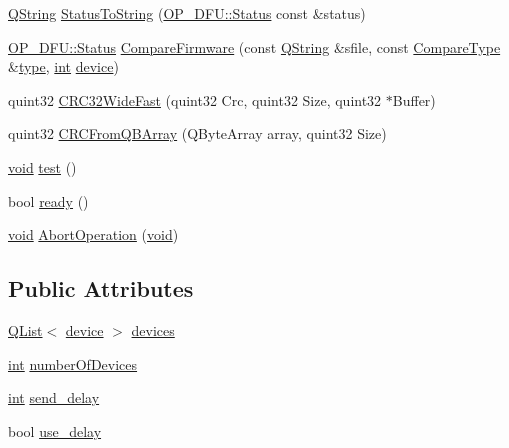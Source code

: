 \begin{DoxyCompactItemize}
\item 
\hyperlink{group___u_a_v_objects_plugin_gab9d252f49c333c94a72f97ce3105a32d}{Q\-String} \hyperlink{class_o_p___d_f_u_ada920c3857a279e408c10b2f68dff3b2}{Status\-To\-String} (\hyperlink{class_o_p___d_f_u_a83b075feaf572fe76e597acea58c8eda}{O\-P\-\_\-\-D\-F\-U\-::\-Status} const \&status)
\item 
\hyperlink{class_o_p___d_f_u_a83b075feaf572fe76e597acea58c8eda}{O\-P\-\_\-\-D\-F\-U\-::\-Status} \hyperlink{class_o_p___d_f_u_af5d4ac61ecb43f70662c41d9a947b431}{Compare\-Firmware} (const \hyperlink{group___u_a_v_objects_plugin_gab9d252f49c333c94a72f97ce3105a32d}{Q\-String} \&sfile, const \hyperlink{class_o_p___d_f_u_a687d96e45447775c09aced0f06db435b}{Compare\-Type} \&\hyperlink{glext_8h_a7d05960f4f1c1b11f3177dc963a45d86}{type}, \hyperlink{ioapi_8h_a787fa3cf048117ba7123753c1e74fcd6}{int} \hyperlink{struct_o_p___d_f_u_1_1device}{device})
\item 
quint32 \hyperlink{class_o_p___d_f_u_aaf63577772e93956b5a25f50e7f205ae}{C\-R\-C32\-Wide\-Fast} (quint32 Crc, quint32 Size, quint32 $\ast$Buffer)
\item 
quint32 \hyperlink{class_o_p___d_f_u_af590f1770ddedabe1d7b829f464b9791}{C\-R\-C\-From\-Q\-B\-Array} (Q\-Byte\-Array array, quint32 Size)
\item 
\hyperlink{group___u_a_v_objects_plugin_ga444cf2ff3f0ecbe028adce838d373f5c}{void} \hyperlink{class_o_p___d_f_u_a23e6121c26e0691c0d756f77eb3801b5}{test} ()
\item 
bool \hyperlink{class_o_p___d_f_u_a58c0a1e25b1dad0431e872d4a3e9fcb1}{ready} ()
\item 
\hyperlink{group___u_a_v_objects_plugin_ga444cf2ff3f0ecbe028adce838d373f5c}{void} \hyperlink{class_o_p___d_f_u_a46a402aac48fbef87d1aa9446d43bedc}{Abort\-Operation} (\hyperlink{group___u_a_v_objects_plugin_ga444cf2ff3f0ecbe028adce838d373f5c}{void})
\end{DoxyCompactItemize}
\subsection*{Public Attributes}
\begin{DoxyCompactItemize}
\item 
\hyperlink{class_q_list}{Q\-List}$<$ \hyperlink{struct_o_p___d_f_u_1_1device}{device} $>$ \hyperlink{class_o_p___d_f_u_aa3ae6f268037d3e8c5db1f7fb488de38}{devices}
\item 
\hyperlink{ioapi_8h_a787fa3cf048117ba7123753c1e74fcd6}{int} \hyperlink{class_o_p___d_f_u_a71b216f3a38822665083d9fad1af709f}{number\-Of\-Devices}
\item 
\hyperlink{ioapi_8h_a787fa3cf048117ba7123753c1e74fcd6}{int} \hyperlink{class_o_p___d_f_u_ad3ea03690b3c015ea33af11b17a7273b}{send\-\_\-delay}
\item 
bool \hyperlink{class_o_p___d_f_u_a0553843cb6851615f6495aa64305552c}{use\-\_\-delay}
\end{DoxyCompactItemize}



